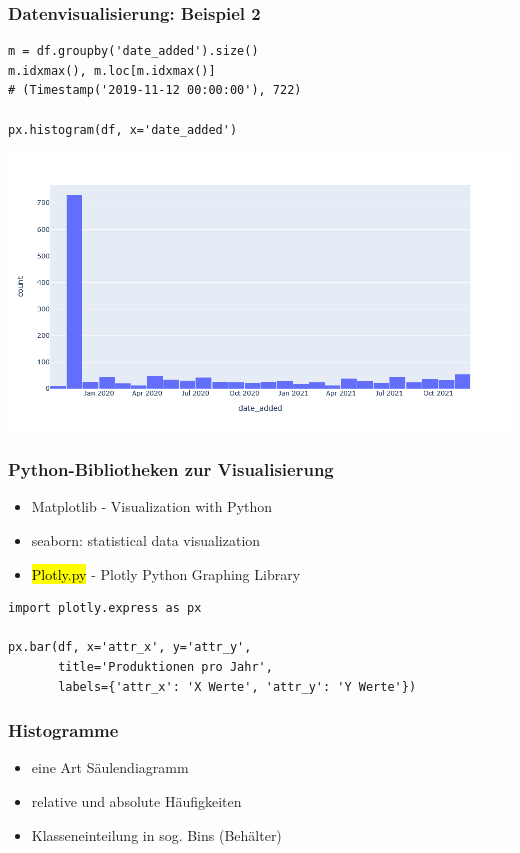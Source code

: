 \begin{frame}[fragile]
\frametitle{Datenvisualisierung: Beispiel 2}

\begin{verbatim}
m = df.groupby('date_added').size()
m.idxmax(), m.loc[m.idxmax()]
# (Timestamp('2019-11-12 00:00:00'), 722)

px.histogram(df, x='date_added')
\end{verbatim}

\begin{center}
	\vspace{-\baselineskip}
	\includegraphics[height=0.5\textheight]{fig5/histogram2.png}
\end{center}
\end{frame}


\begin{frame}[fragile]
\frametitle{Python-Bibliotheken zur Visualisierung}

\begin{itemize}
	\item Matplotlib - Visualization with Python
	\item seaborn: statistical data visualization
	\item \hl{Plotly.py} - Plotly Python Graphing Library
\end{itemize}

\begin{verbatim}
import plotly.express as px

px.bar(df, x='attr_x', y='attr_y',
       title='Produktionen pro Jahr',
       labels={'attr_x': 'X Werte', 'attr_y': 'Y Werte'})
\end{verbatim}
\end{frame}


\begin{frame}
\frametitle{Histogramme}

\begin{itemize}
	\item eine Art Säulendiagramm
	\item relative und absolute Häufigkeiten
	\item Klasseneinteilung in sog. \alert{Bins} (Behälter)
\end{itemize}
\end{frame}



